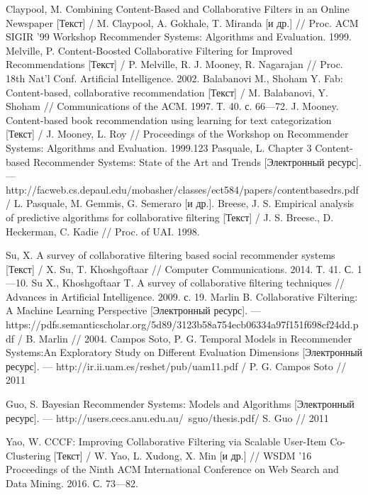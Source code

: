\begin{thebibliography}{119}
 Claypool, M. Combining Content-Based and Collaborative Filters in an Online Newspaper  [Текст] /
M. Claypool, A. Gokhale, T. Miranda [и др.] // Proc. ACM SIGIR ’99 Workshop
Recommender Systems: Algorithms and Evaluation. 1999.
 Melville, P. Content-Boosted Collaborative Filtering
for Improved Recommendations
 [Текст] / P. Melville, R. J. Mooney, R. Nagarajan
// Proc. 18th Nat’l Conf. Artificial Intelligence. 2002.
 Balabanovi M., Shoham Y. Fab: Content-based, collaborative recommendation  [Текст] / M. Balabanovi, Y. Shoham //
Communications of the ACM. 1997. Т. 40. с. 66---72.
 J. Mooney. Content-based book recommendation using learning for
text categorization  [Текст] / J. Mooney, L. Roy // Proceedings of the Workshop on Recommender Systems:
Algorithms and Evaluation. 1999.123
  Pasquale, L. Chapter 3
Content-based Recommender Systems: State of the Art and Trends  [Электронный ресурс]. ---  http://facweb.cs.depaul.edu/mobasher/classes/ect584/papers/contentbasedrs.pdf/
L. Pasquale, M. Gemmis, G. Semeraro [и др.].
 Breese, J. S. Empirical analysis of predictive algorithms
for collaborative filtering  [Текст] / J. S. Breese., D. Heckerman, C. Kadie // Proc. of UAI. 1998.



 Su, X. A survey of collaborative filtering based social
recommender systems  [Текст] / X. Su, T. Khoshgoftaar // Computer Communications. 2014. Т. 41. С. 1---10.
 Su X., Khoshgoftaar T. A survey of collaborative filtering techniques // Advances
in Artificial Intelligence. 2009. с. 19.
 Marlin B. Collaborative Filtering: A Machine Learning Perspective  [Электронный ресурс]. ---
https://pdfs.semanticscholar.org/5d89/3123b58a754ecb06334a97f151f698cf24dd.pdf / B. Marlin // 2004.
 Campos Soto, P. G. Temporal Models in Recommender Systems:An Exploratory
Study on Different Evaluation Dimensions  [Электронный ресурс]. ---
http://ir.ii.uam.es/reshet/pub/uam11.pdf / P. G. Campos Soto // 2011

 Guo, S. Bayesian Recommender Systems: Models and Algorithms  [Электронный ресурс]. ---
http://users.cecs.anu.edu.au/~sguo/thesis.pdf/ S. Guo // 2011

 Yao, W. CCCF: Improving Collaborative Filtering via Scalable User-Item Co-Clustering  [Текст] /
W. Yao, L. Xudong, X. Min [и др.] // WSDM ’16 Proceedings of the Ninth ACM
International Conference on Web Search and Data Mining. 2016. С. 73---82.


\end{thebibliography}
